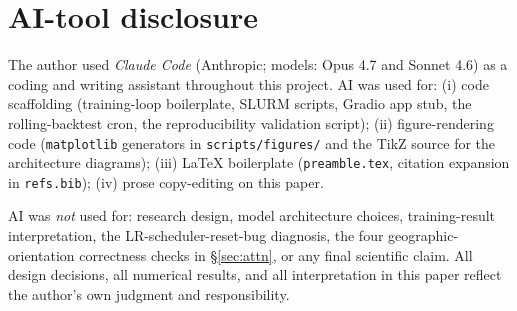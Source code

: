 
\section{AI-tool disclosure}
\label{app:ai}

The author used \emph{Claude Code} (Anthropic; models: Opus 4.7 and Sonnet 4.6) as a coding and writing assistant throughout this project. AI was used for: (i) code scaffolding (training-loop boilerplate, SLURM scripts, Gradio app stub, the rolling-backtest cron, the reproducibility validation script); (ii) figure-rendering code (\texttt{matplotlib} generators in \texttt{scripts/figures/} and the TikZ source for the architecture diagrams); (iii) \LaTeX{} boilerplate (\texttt{preamble.tex}, citation expansion in \texttt{refs.bib}); (iv) prose copy-editing on this paper.

AI was \emph{not} used for: research design, model architecture choices, training-result interpretation, the LR-scheduler-reset-bug diagnosis, the four geographic-orientation correctness checks in \S\ref{sec:attn}, or any final scientific claim. All design decisions, all numerical results, and all interpretation in this paper reflect the author's own judgment and responsibility.
